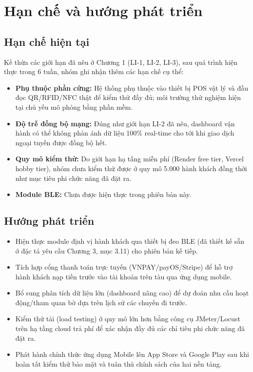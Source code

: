 \section{Hạn chế và hướng phát triển}

\subsection{Hạn chế hiện tại}
Kế thừa các giới hạn đã nêu ở Chương 1 (LI-1, LI-2, LI-3), sau quá trình
hiện thực trong 6 tuần, nhóm ghi nhận thêm các hạn chế cụ thể:
\begin{itemize}
    \item \textbf{Phụ thuộc phần cứng:} Hệ thống phụ thuộc vào thiết bị
    POS vật lý và đầu đọc QR/RFID/NFC thật để kiểm thử đầy đủ; môi
    trường thử nghiệm hiện tại chủ yếu mô phỏng bằng phần mềm.
    \item \textbf{Độ trễ đồng bộ mạng:} Đúng như giới hạn LI-2 đã nêu,
    dashboard vận hành có thể không phản ánh dữ liệu 100\% real-time cho
    tới khi giao dịch ngoại tuyến được đồng bộ hết.
    \item \textbf{Quy mô kiểm thử:} Do giới hạn hạ tầng miễn phí (Render
    free tier, Vercel hobby tier), nhóm chưa kiểm thử được ở quy mô
    5.000 hành khách đồng thời như mục tiêu phi chức năng đã đặt ra.
    \item \textbf{Module BLE:} Chưa được hiện thực trong phiên bản này.
\end{itemize}

\subsection{Hướng phát triển}
\begin{itemize}
    \item Hiện thực module định vị hành khách qua thiết bị đeo BLE (đã
    thiết kế sẵn ở đặc tả yêu cầu Chương 3, mục 3.11) cho phiên bản kế
    tiếp.
    \item Tích hợp cổng thanh toán trực tuyến (VNPAY/payOS/Stripe) để hỗ
    trợ hành khách nạp tiền trước vào tài khoản trên tàu qua ứng dụng
    mobile.
    \item Bổ sung phân tích dữ liệu lớn (dashboard nâng cao) để dự đoán
    nhu cầu hoạt động/tham quan bờ dựa trên lịch sử các chuyến đi trước.
    \item Kiểm thử tải (load testing) ở quy mô lớn hơn bằng công cụ
    JMeter/Locust trên hạ tầng cloud trả phí để xác nhận đầy đủ các chỉ
    tiêu phi chức năng đã đặt ra.
    \item Phát hành chính thức ứng dụng Mobile lên App Store và Google
    Play sau khi hoàn tất kiểm thử bảo mật và tuân thủ chính sách của
    hai nền tảng.
\end{itemize}